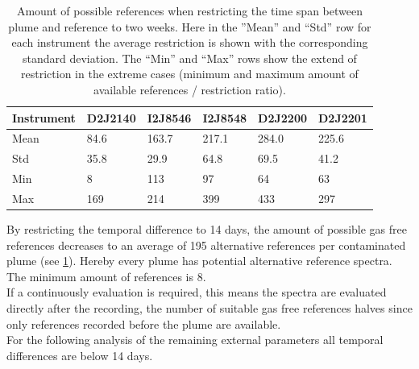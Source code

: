 \begin{table}[h]
	\centering
	\begin{tabular}{|p{1.8cm}|p{2.15cm}|p{2.15cm}|p{2.15cm}|p{2.15cm}|p{2.15cm}|}
		Instrument	&D2J2140&I2J8546& I2J8548&D2J2200&D2J2201\\
		\toprule
		Mean&84.6 &163.7 &217.1&284.0 &225.6 \\
		\midrule
		Std&
		35.8&%
		29.9&%
		64.8&%
		69.5&%
		41.2\\%
		\midrule
		Min&
		8 &%
		113&%
		97 &%
		64&%
		63\\%
		\midrule
		Max&
		169&%
		214&%
		399&%
		433&%
		297\\%
		\bottomrule
	\end{tabular}
	\caption{Amount of possible references when restricting the time span between plume and reference to two weeks. Here in the ”Mean” and “Std” row for each  instrument the average restriction is shown with the corresponding standard deviation. The “Min” and “Max” rows show the extend of restriction in the extreme cases (minimum and maximum amount of available references / restriction ratio).}
	\label{Tab:refstime}
\end{table}	
By restricting the temporal difference to 14 days, the amount of possible gas free references decreases to an average of 195 alternative references per contaminated plume (see \cref{Tab:refstime}). Hereby every plume has potential alternative reference spectra. The minimum amount of references is 8.\\
If a continuously evaluation is required, this means the spectra are evaluated directly after the recording, the number of suitable gas free references halves since only references recorded before the plume are available.\\
\nopagebreak
For the following analysis of the remaining external parameters all temporal differences are below 14 days.
